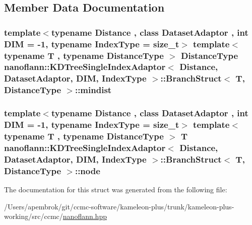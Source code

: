 \subsection{Member Data Documentation}
\hypertarget{structnanoflann_1_1_k_d_tree_single_index_adaptor_1_1_branch_struct_aa62cca16bd04ba7fd2ef25b3d3e8a6fa}{
\subsubsection[{mindist}]{\setlength{\rightskip}{0pt plus 5cm}template$<$typename Distance , class Dataset\-Adaptor , int D\-I\-M = -\/1, typename Index\-Type  = size\-\_\-t$>$ template$<$typename T , typename Distance\-Type $>$ {\bf Distance\-Type} {\bf nanoflann\-::\-K\-D\-Tree\-Single\-Index\-Adaptor}$<$ Distance, Dataset\-Adaptor, D\-I\-M, Index\-Type $>$\-::{\bf Branch\-Struct}$<$ T, {\bf Distance\-Type} $>$\-::mindist}}\label{structnanoflann_1_1_k_d_tree_single_index_adaptor_1_1_branch_struct_aa62cca16bd04ba7fd2ef25b3d3e8a6fa}
\hypertarget{structnanoflann_1_1_k_d_tree_single_index_adaptor_1_1_branch_struct_a86bcc74bb89be6b93db206feb8a3aad7}{
\subsubsection[{node}]{\setlength{\rightskip}{0pt plus 5cm}template$<$typename Distance , class Dataset\-Adaptor , int D\-I\-M = -\/1, typename Index\-Type  = size\-\_\-t$>$ template$<$typename T , typename Distance\-Type $>$ T {\bf nanoflann\-::\-K\-D\-Tree\-Single\-Index\-Adaptor}$<$ Distance, Dataset\-Adaptor, D\-I\-M, Index\-Type $>$\-::{\bf Branch\-Struct}$<$ T, {\bf Distance\-Type} $>$\-::node}}\label{structnanoflann_1_1_k_d_tree_single_index_adaptor_1_1_branch_struct_a86bcc74bb89be6b93db206feb8a3aad7}


The documentation for this struct was generated from the following file\-:\begin{DoxyCompactItemize}
\item 
/\-Users/apembrok/git/ccmc-\/software/kameleon-\/plus/trunk/kameleon-\/plus-\/working/src/ccmc/\hyperlink{nanoflann_8hpp}{nanoflann.\-hpp}\end{DoxyCompactItemize}
